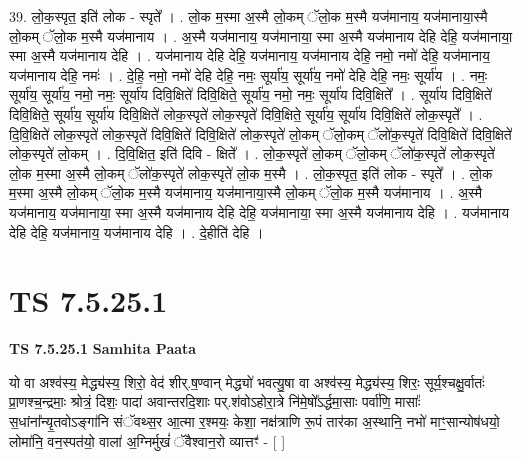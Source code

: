 \documentclass[17pt]{extarticle}
\begin{document}
39. लो॒क॒स्पृत॒ इति॑ लोक - स्पृते᳚ । . लो॒क म॒स्मा अ॒स्मै लो॒कम् ॅलो॒क म॒स्मै यज॑मानाय॒ यज॑मानाया॒स्मै लो॒कम् ॅलो॒क म॒स्मै यज॑मानाय । . अ॒स्मै यज॑मानाय॒ यज॑मानाया॒ स्मा अ॒स्मै यज॑मानाय देहि देहि॒ यज॑मानाया॒ स्मा अ॒स्मै यज॑मानाय देहि । . यज॑मानाय देहि देहि॒ यज॑मानाय॒ यज॑मानाय देहि॒ नमो॒ नमो॑ देहि॒ यज॑मानाय॒ यज॑मानाय देहि॒ नमः॑ । . दे॒हि॒ नमो॒ नमो॑ देहि देहि॒ नमः॒ सूर्या॑य॒ सूर्या॑य॒ नमो॑ देहि देहि॒ नमः॒ सूर्या॑य । . नमः॒ सूर्या॑य॒ सूर्या॑य॒ नमो॒ नमः॒ सूर्या॑य दिवि॒क्षिते॑ दिवि॒क्षिते॒ सूर्या॑य॒ नमो॒ नमः॒ सूर्या॑य दिवि॒क्षिते᳚ । . सूर्या॑य दिवि॒क्षिते॑ दिवि॒क्षिते॒ सूर्या॑य॒ सूर्या॑य दिवि॒क्षिते॑ लोक॒स्पृते॑ लोक॒स्पृते॑ दिवि॒क्षिते॒ सूर्या॑य॒ सूर्या॑य दिवि॒क्षिते॑ लोक॒स्पृते᳚ । . दि॒वि॒क्षिते॑ लोक॒स्पृते॑ लोक॒स्पृते॑ दिवि॒क्षिते॑ दिवि॒क्षिते॑ लोक॒स्पृते॑ लो॒कम् ॅलो॒कम् ॅलो॑क॒स्पृते॑ दिवि॒क्षिते॑ दिवि॒क्षिते॑ लोक॒स्पृते॑ लो॒कम् । . दि॒वि॒क्षित॒ इति॑ दिवि - क्षिते᳚ । . लो॒क॒स्पृते॑ लो॒कम् ॅलो॒कम् ॅलो॑क॒स्पृते॑ लोक॒स्पृते॑ लो॒क म॒स्मा अ॒स्मै लो॒कम् ॅलो॑क॒स्पृते॑ लोक॒स्पृते॑ लो॒क म॒स्मै । . लो॒क॒स्पृत॒ इति॑ लोक - स्पृते᳚ । . लो॒क म॒स्मा अ॒स्मै लो॒कम् ॅलो॒क म॒स्मै यज॑मानाय॒ यज॑मानाया॒स्मै लो॒कम् ॅलो॒क म॒स्मै यज॑मानाय । . अ॒स्मै यज॑मानाय॒ यज॑मानाया॒ स्मा अ॒स्मै यज॑मानाय देहि देहि॒ यज॑मानाया॒ स्मा अ॒स्मै यज॑मानाय देहि । . यज॑मानाय देहि देहि॒ यज॑मानाय॒ यज॑मानाय देहि । . दे॒हीति॑ देहि । \newline
\pagebreak
{}

\section{ TS 7.5.25.1 }

\textbf{TS 7.5.25.1 } \newline
\textbf{Samhita Paata} \newline

यो वा अश्व॑स्य॒ मेद्ध्य॑स्य॒ शिरो॒ वेद॑ शीर्.ष॒ण्वान् मेद्ध्यो॑ भवत्यु॒षा वा अश्व॑स्य॒ मेद्ध्य॑स्य॒ शिरः॒ सूर्य॒श्चक्षु॒र्वातः॑ प्रा॒णश्च॒न्द्रमाः॒ श्रोत्रं॒ दिशः॒ पादा॑ अवान्तरदि॒शाः पर्.श॑वोऽहोरा॒त्रे नि॑मे॒षो᳚ऽर्द्धमा॒साः पर्वा॑णि॒ मासाः᳚ स॒धांना᳚न्यृ॒तवोऽङ्गा॑नि संॅवथ्स॒र आ॒त्मा र॒श्मयः॒ केशा॒ नक्ष॑त्राणि रू॒पं तार॑का अ॒स्थानि॒ नभो॑ माꣳ॒॒सान्योष॑धयो॒ लोमा॑नि॒ वन॒स्पत॑यो॒ वाला॑ अ॒ग्निर्मुखं॑ ॅवैश्वान॒रो व्यात्तꣳ॑ - [  ] \newline
\end{document}
